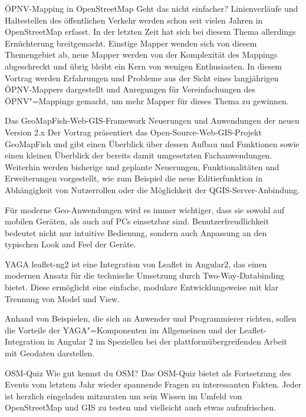 %
{ÖPNV-Mapping in OpenStreetMap}%
{Geht das nicht einfacher?}%
{Linienverläufe und Haltestellen des öffentlichen Verkehr werden schon seit vielen Jahren in
OpenStreetMap erfasst. In der letzten Zeit hat sich bei diesem Thema allerdings Ernüchterung
breitgemacht. Einstige Mapper wenden sich von diesem Themengebiet ab, neue Mapper werden von der
Komplexität des Mappings abgeschreckt und übrig bleibt ein Kern von wenigen Enthusiasten.
In diesem
Vortrag werden Erfahrungen und Probleme aus der Sicht eines langjährigen ÖPNV-Mappers dargestellt
und Anregungen für Vereinfachungen des ÖPNV"=Mappings gemacht, um mehr Mapper für dieses Thema zu
gewinnen.}

%
{Das GeoMapFish-Web-GIS-Framework}%
{Neuerungen und Anwendungen der neuen Version 2.x}%
{Der Vortrag präsentiert das Open-Source-Web-GIS-Projekt GeoMapFish und gibt einen Überblick über
dessen Aufbau und Funktionen sowie einen kleinen Überblick der bereits damit umgesetzten
Fachanwendungen. Weiterhin werden bisherige und geplante Neuerungen, Funktionalitäten und
Erweiterungen vorgestellt, wie zum Beispiel die neue Editierfunktion in Abhängigkeit von
Nutzerrollen oder die Möglichkeit der QGIS-Server-Anbindung.}

%
{}%
{Für moderne Geo-Anwendungen wird es immer wichtiger, dass sie sowohl auf
mobilen Geräten, als auch auf PCs einsetzbar sind. Benutzerfreudlichkeit
bedeutet nicht nur intuitive Bedienung, sondern auch Anpassung an den typischen
Look and Feel der Geräte.

YAGA leaflet-ng2 ist eine Integration von Leaflet in Angular2, das einen
modernen Ansatz für die technische Umsetzung durch Two-Way-Databinding
bietet. Diese ermöglicht eine einfache, modulare Entwicklungsweise mit klar
Trennung von Model und View.

Anhand von Beispielen, die sich an Anwender und Programmierer richten, sollen
die Vorteile der YAGA"=Komponenten im Allgemeinen und der Leaflet-Integration in
Angular 2 im Speziellen bei der plattformübergreifenden Arbeit mit Geodaten
darstellen.
}

%
{OSM-Quiz}%
{Wie gut kennst du OSM?}%
{Das OSM-Quiz bietet als Fortsetzung des Events vom letztem Jahr wieder spannende Fragen zu
interessanten Fakten. Jeder ist herzlich eingeladen mitzuraten um sein Wissen im Umfeld von
OpenStreetMap und GIS zu testen und vielleicht auch etwas aufzufrischen.}

\vspace{-1\baselineskip}
